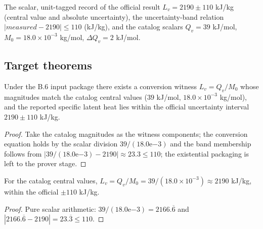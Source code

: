 \begin{definition}
\label{def:IPhO2026Problems_problem_IPhO_2026_4_B_6:SpecificLatentHeatValue}
The scalar, unit-tagged record of the official result
$L_v = 2190 \pm 110$ kJ/kg (central value and absolute uncertainty), the
uncertainty-band relation $|measured - 2190| \le 110$ (kJ/kg), and the
catalog scalars $Q_v = 39$ kJ/mol, $M_0 = 18.0 \times 10^{-3}$ kg/mol,
$\Delta Q_v = 2$ kJ/mol.
\end{definition}

\subsection*{Target theorems}

\begin{theorem}
\label{thm:IPhO2026Problems_problem_IPhO_2026_4_B_6:latent_heat_per_unit_mass_target}
Under the B.6 input package there exists a conversion witness
$L_v = Q_v/M_0$ whose magnitudes match the catalog central values
($39$ kJ/mol, $18.0 \times 10^{-3}$ kg/mol), and the reported specific
latent heat lies within the official uncertainty interval
$2190 \pm 110$ kJ/kg.
\end{theorem}
\begin{proof}
Take the catalog magnitudes as the witness components; the conversion
equation holds by the scalar division $39/(18.0\mathrm{e}{-3})$ and the
band membership follows from
$|39/(18.0\mathrm{e}{-3}) - 2190| \approx 23.3 \le 110$; the existential
packaging is left to the prover stage.
\end{proof}

\begin{theorem}
\label{thm:IPhO2026Problems_problem_IPhO_2026_4_B_6:latent_heat_per_unit_mass_formula}
For the catalog central values,
$L_v = Q_v/M_0 = 39/(18.0 \times 10^{-3}) \approx 2190$ kJ/kg, within the
official $\pm 110$ kJ/kg.
\end{theorem}
\begin{proof}
Pure scalar arithmetic: $39/(18.0\mathrm{e}{-3}) = 2166.\overline{6}$ and
$|2166.\overline{6} - 2190| = 23.\overline{3} \le 110$.
\end{proof}

